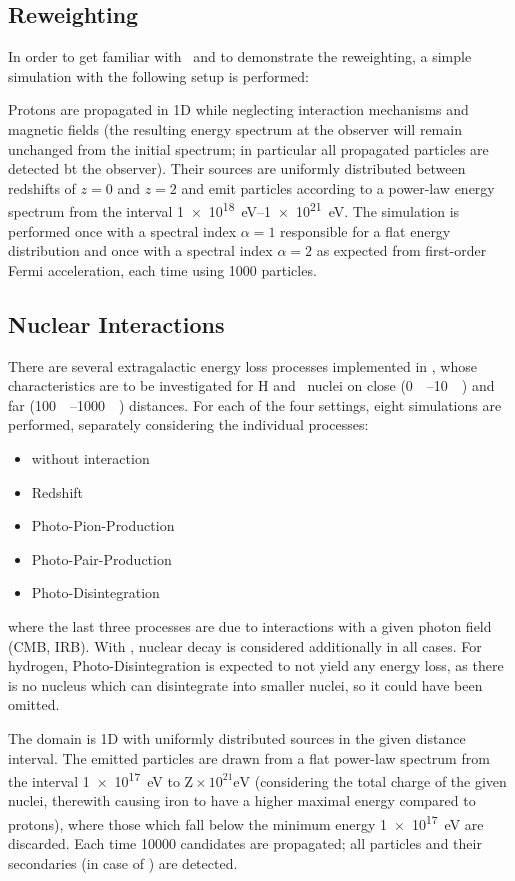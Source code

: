 \subsection{Reweighting}
In order to get familiar with \CRPropa~and to demonstrate the reweighting, a
simple simulation with the following setup is performed:

Protons are propagated in 1D while neglecting interaction mechanisms and
magnetic fields (the resulting energy spectrum at the observer will remain
unchanged from the initial spectrum; in particular all propagated particles
are detected bt the observer). Their sources are uniformly distributed
between redshifts of $z=0$ and $z=2$ and emit particles according to a
power-law energy spectrum from the interval \SIrange{1e18}{1e21}{\eV}. The
simulation is performed once with a spectral index $\alpha=1$ responsible for
a flat energy distribution and once with a spectral index $\alpha=2$ as
expected from first-order Fermi acceleration, each time using \num{1000}
particles.


\subsection{Nuclear Interactions}
There are several extragalactic energy loss processes implemented in
\CRPropa, whose characteristics are to be investigated for H and \Fe~nuclei on
close (\SIrange{0}{10}{\mega\parsec}) and far
(\SIrange{100}{1000}{\mega\parsec}) distances. For each of the four settings,
eight simulations are performed, separately considering the individual
processes:
\begin{itemize}
    \item without interaction
    \item Redshift
    \item Photo-Pion-Production
    \item Photo-Pair-Production
    \item Photo-Disintegration
\end{itemize}
where the last three processes are due to interactions with a given photon
field (CMB, IRB). With \Fe, nuclear decay is considered additionally in all
cases.
For hydrogen, Photo-Disintegration is expected to not yield any energy loss, as
there is no nucleus which can disintegrate into smaller nuclei, so it could
have been omitted.

The domain is 1D with uniformly distributed sources in the given distance
interval.
The emitted particles are drawn from a flat power-law spectrum from the
interval \SI{1e17}{\eV} to $\text{Z}\times10^{21}\si{\eV}$ (considering the
total charge of the given nuclei, therewith causing iron to have a higher
maximal energy compared to protons), where those which fall below the minimum
energy \SI{1e17}{\eV} are discarded. Each time \num{10000} candidates are
propagated; all particles and their secondaries (in case of \Fe) are detected.


